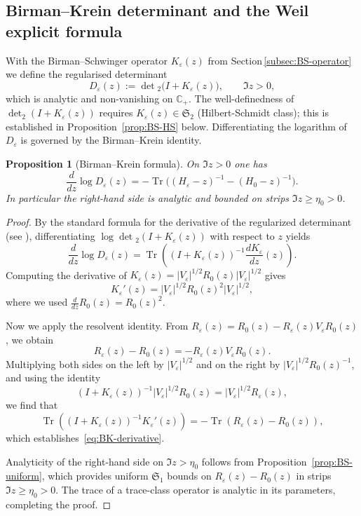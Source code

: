 ﻿\documentclass[12pt,a4paper]{article}
\newtheorem{proposition}[theorem]{Proposition}
\theoremstyle{definition}
\theoremstyle{remark}
\newcommand{\CC}{\mathbb{C}}
\newcommand{\Tr}{\operatorname{Tr}}
\begin{document}
\subsection{Birman--Krein determinant and the Weil explicit formula}
\label{subsec:BK-vs-Weil}
With the Birman--Schwinger operator $K_\varepsilon(z)$ from Section\,\ref{subsec:BS-operator} we define the regularised determinant
\begin{equation}
  D_\varepsilon(z) := \det{}_2\bigl(I+K_\varepsilon(z)\bigr),
  \qquad \Im z>0,
  \label{eq:def-det2}
\end{equation}
which is analytic and non-vanishing on $\CC_+$. The well-definedness of $\det_2(I + K_\varepsilon(z))$ requires $K_\varepsilon(z) \in \mathfrak{S}_2$ (Hilbert-Schmidt class); this is established in Proposition~\ref{prop:BS-HS} below. Differentiating the logarithm of $D_\varepsilon$ is governed by the Birman--Krein identity.

\begin{proposition}[Birman--Krein formula]\label{prop:BK-formula}
On $\Im z>0$ one has
\begin{equation}
  \frac{d}{dz}\log D_\varepsilon(z)
  = -\Tr\bigl( (H_\varepsilon-z)^{-1}-(H_0-z)^{-1} \bigr).
  \label{eq:BK-derivative}
\end{equation}
In particular the right-hand side is analytic and bounded on strips $\Im z\ge\eta_0>0$.
\end{proposition}

\begin{proof}
By the standard formula for the derivative of the regularized determinant (see \cite[Thm.~3.5]{SimonTraceIdeals}), differentiating $\log\det{}_2(I+K_\varepsilon(z))$ with respect to $z$ yields
\[
  \frac{d}{dz}\log D_\varepsilon(z)=\Tr\left((I+K_\varepsilon(z))^{-1}\frac{dK_\varepsilon}{dz}(z)\right).
\]
Computing the derivative of $K_\varepsilon(z) = |V_\varepsilon|^{1/2}R_0(z)|V_\varepsilon|^{1/2}$ gives
\[
  K_\varepsilon'(z)=|V_\varepsilon|^{1/2}R_0(z)^2|V_\varepsilon|^{1/2},
\]
where we used $\frac{d}{dz}R_0(z) = R_0(z)^2$.

Now we apply the resolvent identity. From $R_\varepsilon(z) = R_0(z) - R_\varepsilon(z)V_\varepsilon R_0(z)$, we obtain
\[
  R_\varepsilon(z)-R_0(z) = -R_\varepsilon(z)V_\varepsilon R_0(z).
\]
Multiplying both sides on the left by $|V_\varepsilon|^{1/2}$ and on the right by $|V_\varepsilon|^{1/2}R_0(z)^{-1}$, and using the identity
\[
  (I+K_\varepsilon(z))^{-1}|V_\varepsilon|^{1/2}R_0(z)=|V_\varepsilon|^{1/2}R_\varepsilon(z),
\]
we find that
\[
  \Tr\left((I+K_\varepsilon(z))^{-1}K_\varepsilon'(z)\right) = -\Tr(R_\varepsilon(z)-R_0(z)),
\]
which establishes~\eqref{eq:BK-derivative}.

Analyticity of the right-hand side on $\Im z > \eta_0$ follows from Proposition~\ref{prop:BS-uniform}, which provides uniform $\mathfrak{S}_1$ bounds on $R_\varepsilon(z)-R_0(z)$ in strips $\Im z \geq \eta_0 > 0$. The trace of a trace-class operator is analytic in its parameters, completing the proof.
\end{proof}
\end{document}
